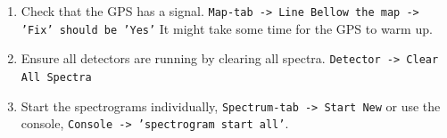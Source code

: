 \begin{enumerate}
    \item Check that the GPS has a signal. \texttt{Map-tab -> Line Bellow the map -> 'Fix' should be 'Yes'} It might take some time for the GPS to warm up.
    \item Ensure all detectors are running by clearing all spectra. \texttt{Detector -> Clear All Spectra}
    \item Start the spectrograms individually, \texttt{Spectrum-tab -> Start New} or use the console, \texttt{Console -> 'spectrogram start all'}.
\end{enumerate}